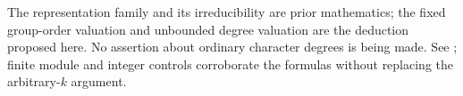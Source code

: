 The representation family and its irreducibility are prior mathematics;
the fixed group-order valuation and unbounded degree valuation are the
deduction proposed here. No assertion about ordinary character degrees
is being made. See ;
finite module and integer controls corroborate the formulas without
replacing the arbitrary-\(k\) argument.
